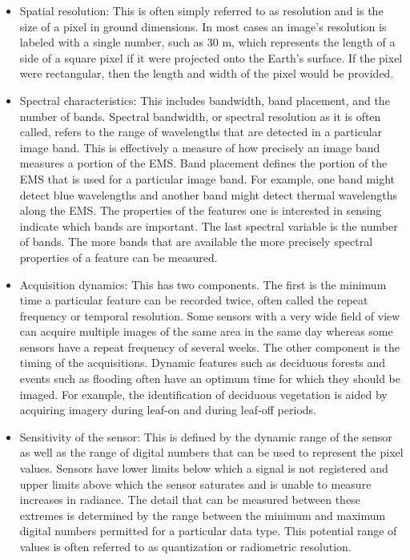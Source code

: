     \begin{itemize}
        \item Spatial resolution: This is often simply referred to as resolution and is the size of a pixel in ground dimensions. 
        In most cases an image's resolution is labeled with a single number, such as 30 m, which represents the length of a side of a square pixel if it were projected onto the Earth's surface.
        If the pixel were rectangular, then the length and width of the pixel would be provided.
        \item Spectral characteristics: This includes bandwidth, band placement, and the number of bands.
        Spectral bandwidth, or spectral resolution as it is often called, refers to the range of wavelengths that are detected in a particular image band.
        This is effectively a measure of how precisely an image band measures a portion of the EMS.
        Band placement defines the portion of the EMS that is used for a particular image band.
        For example, one band might detect blue wavelengths and another band might detect thermal wavelengths along the EMS.
        The properties of the features one is interested in sensing indicate which bands are important.
        The last spectral variable is the number of bands. The more bands that are available the more precisely spectral properties of a feature can be measured.
        \item Acquisition dynamics: This has two components. The first is the minimum time a particular feature can be recorded twice, often called the repeat frequency or temporal resolution.
        Some sensors with a very wide field of view can acquire multiple images of the same area in the same day whereas some sensors have a repeat frequency of several weeks.
        The other component is the timing of the acquisitions. 
        Dynamic features such as deciduous forests and events such as flooding often have an optimum time for which they should be imaged.
        For example, the identification of deciduous vegetation is aided by acquiring imagery during leaf-on and during leaf-off periods.
        \item Sensitivity of the sensor: This is defined by the dynamic range of the sensor as well as the range of digital numbers that can be used to represent the pixel values.
        Sensors have lower limits below which a signal is not registered and upper limits above which the sensor saturates and is unable to measure increases in radiance.
        The detail that can be measured between these extremes is determined by the range between the minimum and maximum digital numbers permitted for a particular data type.
        This potential range of values is often referred to as quantization or radiometric resolution.
    \end{itemize}
    

